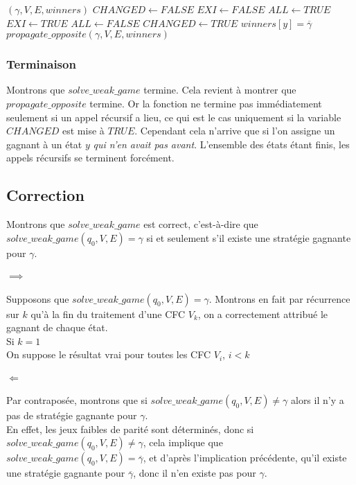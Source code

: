 \documentclass[10pt,a4paper]{article}
\begin{document}
\begin{algorithm}
\caption{$propagate\_opposite$}

\begin{algorithmic}[1]
	\REQUIRE $(\gamma, V, E, winners)$
	\STATE $CHANGED \leftarrow FALSE$
			\STATE $EXI \leftarrow FALSE$
			\STATE $ALL \leftarrow TRUE$
					\STATE $EXI \leftarrow TRUE$
				\ELSE
					\STATE $ALL \leftarrow FALSE$
				\ENDIF
			\ENDFOR
				\STATE $CHANGED \leftarrow TRUE$
				\STATE $winners[y] = \overline{\gamma}$
			\ENDIF
		\ENDIF
	\ENDFOR
		\STATE $propagate\_opposite(\gamma, V, E, winners)$
	\ENDIF
	\RETURN
\end{algorithmic}
\end{algorithm}

\subsubsection{Terminaison}
Montrons que $solve\_weak\_game$ termine. Cela revient à montrer que $propagate\_opposite$ termine. Or la fonction ne termine pas immédiatement seulement si un appel récursif a lieu, ce qui est le cas uniquement si la variable $CHANGED$ est mise à $TRUE$. Cependant cela n'arrive que si l'on assigne un gagnant à un état $y$ \emph{qui n'en avait pas avant}. L'ensemble des états étant finis, les appels récursifs se terminent forcément.

\subsection{Correction}
Montrons que $solve\_weak\_game$ est correct, c'est-à-dire que $solve\_weak\_game(q_0,V,E) = \gamma$ si et seulement s'il existe une stratégie gagnante pour $\gamma$.

\paragraph{$\implies$}
Supposons que $solve\_weak\_game(q_0,V,E) = \gamma$. Montrons en fait par récurrence sur $k$ qu'à la fin du traitement d'une CFC $V_k$, on a correctement attribué le gagnant de chaque état.\\
Si $k = 1$
\\
On suppose le résultat vrai pour toutes les CFC $V_i$, $i < k$

\paragraph{$\Longleftarrow$}
Par contraposée, montrons que si $solve\_weak\_game(q_0,V,E) \neq \gamma$ alors il n'y a pas de stratégie gagnante pour $\gamma$.\\
En effet, les jeux faibles de parité sont déterminés, donc si $solve\_weak\_game(q_0,V,E) \neq \gamma$, cela implique que $solve\_weak\_game(q_0,V,E) = \overline{\gamma}$, et d'après l'implication précédente, qu'il existe une stratégie gagnante pour $\overline{\gamma}$, donc il n'en existe pas pour $\gamma$.
\end{document}
